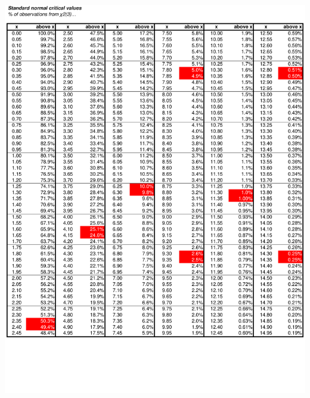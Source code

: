 \documentclass[8pt,letterpaper, landscape]{extarticle} %
\begin{document}
\begin{center}
\includegraphics[height=9.75in, angle=90]{cv5}

\end{center}
\end{document}
